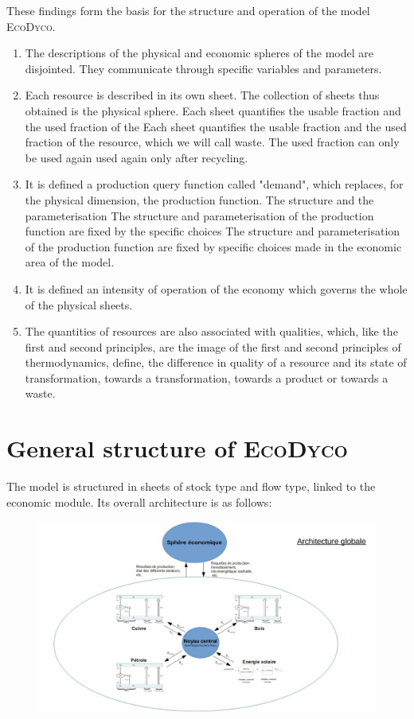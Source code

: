 \documentclass[12pt,a4paper]{article}%
\newcommand{\ed}{\textsc{EcoDyco}}
\begin{document}
\noindent These findings form the basis for the structure and operation of the model \ed.

\begin{enumerate}
	\item The descriptions of the physical and economic spheres of the model
	are disjointed. They communicate through specific variables and parameters. 
	
	\item Each resource is described in its own sheet. The collection of sheets thus obtained is the physical sphere. Each sheet quantifies the usable fraction and the used fraction of the
	Each sheet quantifies the usable fraction and the used fraction of the resource, which we will call waste. The used fraction can only be used again
	used again only after recycling.
	
	\item It is defined a production query function called "demand", which
	replaces, for the physical dimension, the production function. The structure and the parameterisation 
	The structure and parameterisation of the production function are fixed by the specific choices
	The structure and parameterisation of the production function are fixed by specific choices made in the economic area of the model.
	
	\item It is defined an intensity of operation of the economy which governs
	the whole of the physical sheets.
	
	\item The quantities of resources are also associated with qualities, which, like the first and second principles, are
	the image of the first and second principles of thermodynamics, define,
	the difference in quality of a resource and its state of transformation, towards a
	transformation, towards a product or towards a waste.
\end{enumerate}


\section{General structure of \ed}

The model is structured in sheets of stock type and flow type,
linked to the economic module. Its overall architecture is as follows:


\begin{figure}[h]
\centering \includegraphics[width=1.0\textwidth]{figures/Archiglobale.jpg}\end{figure}
\end{document}
